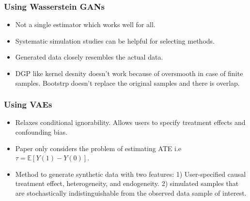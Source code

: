 \documentclass{beamer}
\begin{document}
\begin{frame}
	\frametitle{Using Wasserstein GANs}
	\begin{itemize}
		\item Not a single estimator which works well for all.
		\item Systematic simulation studies can be helpful for selecting methods.
		\item Generated data closely resembles the actual data.
		\item DGP like kernel desnity doesn't work because of oversmooth in case of finite samples. Bootstrp doesn't replace the original samples and there is overlap.
	\end{itemize}
\end{frame}

\begin{frame}
	\frametitle{Using VAEs}
	\begin{itemize}
		\item Relaxes conditional ignorability. Allows users to specify treatment effects and confounding bias.
		\item Paper only considers the problem of estimating ATE i.e $ \tau = \mathbb{E}[Y(1) - Y(0)] $.
		\item Method to generate synthetic data with two features: 1) User-specified causal treatment effect, heterogeneity, and endogeneity. 2) simulated samples that are stochastically indistinguishable from the observed data sample of interest.
	\end{itemize}
\end{frame}
\end{document}
